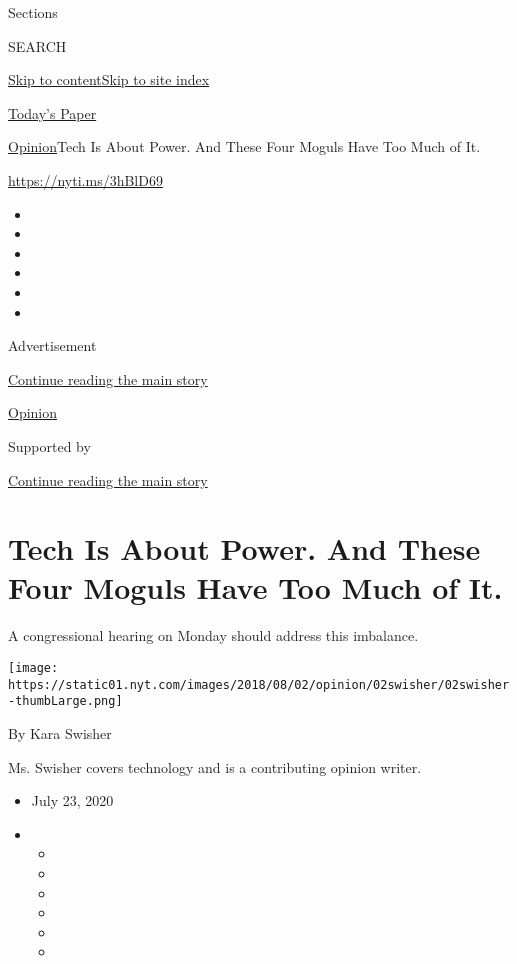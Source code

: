 Sections

SEARCH

\protect\hyperlink{site-content}{Skip to
content}\protect\hyperlink{site-index}{Skip to site index}

\href{https://myaccount.nytimes.com/auth/login?response_type=cookie\&client_id=vi}{}

\href{https://www.nytimes.com/section/todayspaper}{Today's Paper}

\href{/section/opinion}{Opinion}\textbar{}Tech Is About Power. And These
Four Moguls Have Too Much of It.

\href{https://nyti.ms/3hBlD69}{https://nyti.ms/3hBlD69}

\begin{itemize}
\item
\item
\item
\item
\item
\item
\end{itemize}

Advertisement

\protect\hyperlink{after-top}{Continue reading the main story}

\href{/section/opinion}{Opinion}

Supported by

\protect\hyperlink{after-sponsor}{Continue reading the main story}

\hypertarget{tech-is-about-power-and-these-four-moguls-have-too-much-of-it}{%
\section{Tech Is About Power. And These Four Moguls Have Too Much of
It.}\label{tech-is-about-power-and-these-four-moguls-have-too-much-of-it}}

A congressional hearing on Monday should address this imbalance.

\texttt{[image: https://static01.nyt.com/images/2018/08/02/opinion/02swisher/02swisher-thumbLarge.png]}

By Kara Swisher

Ms. Swisher covers technology and is a contributing opinion writer.

\begin{itemize}
\item
  July 23, 2020
\item
  \begin{itemize}
  \item
  \item
  \item
  \item
  \item
  \item
  \end{itemize}
\end{itemize}

